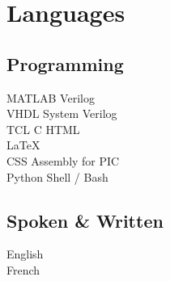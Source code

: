 \documentclass[]{deedy-resume-openfont-wjl}
\begin{document}
\section{Languages}
\begin{minipage}[t]{.69\textwidth}
  \subsection{Programming}
  \begin{multicols}{3}
     \textbullet{} MATLAB \textbullet{} Verilog \\ \textbullet{} VHDL \textbullet{} System Verilog \\ \columnbreak
     \textbullet{} TCL \textbullet{} C \textbullet{} HTML \\ \textbullet{} \LaTeX\  \\  \columnbreak
     \textbullet{} CSS \textbullet{} Assembly for PIC \\ \textbullet{} Python \textbullet{} Shell / Bash
  \end{multicols}
\end{minipage}
\hfill %
\begin{minipage}[t]{.30\textwidth}
  \subsection{Spoken \& Written}
  \begin{multicols}{2}
     English\\  \columnbreak
     French\\
  \end{multicols}
\end{minipage}



\end{document}
